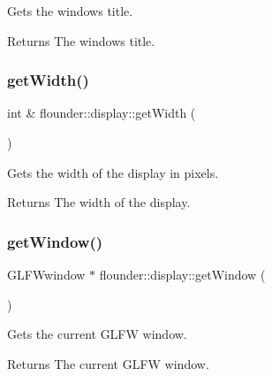 Gets the window\textquotesingle{}s title. 

\begin{DoxyReturn}{Returns}
The window\textquotesingle{}s title. 
\end{DoxyReturn}
\mbox{\label{classflounder_1_1display_ac2b45bb8c8924b985895f2b08c03c3d9}} 
\subsubsection{\texorpdfstring{get\+Width()}{getWidth()}}
{\footnotesize\ttfamily int \& flounder\+::display\+::get\+Width (\begin{DoxyParamCaption}{ }\end{DoxyParamCaption})}



Gets the width of the display in pixels. 

\begin{DoxyReturn}{Returns}
The width of the display. 
\end{DoxyReturn}
\mbox{\label{classflounder_1_1display_a5cdcd3dddce4cf63ac45503b03e96689}} 
\subsubsection{\texorpdfstring{get\+Window()}{getWindow()}}
{\footnotesize\ttfamily G\+L\+F\+Wwindow $\ast$ flounder\+::display\+::get\+Window (\begin{DoxyParamCaption}{ }\end{DoxyParamCaption})}



Gets the current G\+L\+FW window. 

\begin{DoxyReturn}{Returns}
The current G\+L\+FW window. 
\end{DoxyReturn}
\mbox{\label{classflounder_1_1display_acd9fd5a794f2c31633d5e0a707b53861}} 
